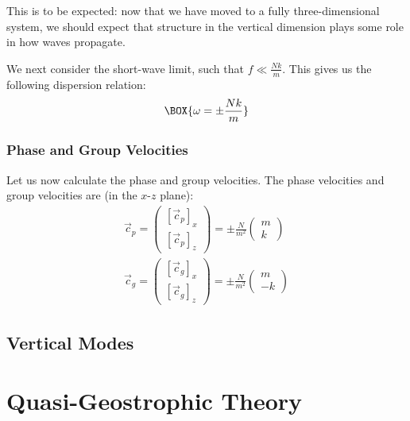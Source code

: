 This is to be expected: now that we have moved to a fully three-dimensional system, we should expect that structure in the vertical dimension plays some role in how waves propagate.

We next consider the short-wave limit, such that \(f\ll \frac{Nk}{m}\). This gives us the following dispersion relation:
\begin{align*}
    \BOX{\omega = \pm \frac{Nk}{m}}
\end{align*}

\subsubsection{Phase and Group Velocities}

Let us now calculate the phase and group velocities. The phase velocities and group velocities are (in the \(x\)-\(z\) plane):
\begin{align*}
    \vec{c}_p = \left( \begin{array}{c}
        [\vec{c}_p]_x
        \\
        [6pt]
        [\vec{c}_p]_z
    \end{array} \right)
    =
    \pm \frac{N}{m^2}\left( \begin{array}{c}
        m
        \\
        [6pt]
        k
    \end{array} \right)
    \\
    \vec{c}_g = \left( \begin{array}{c}
        [\vec{c}_g]_x
        \\
        [6pt]
        [\vec{c}_g]_z
    \end{array} \right)
    =
    \pm \frac{N}{m^2}\left( \begin{array}{c}
        m
        \\
        [6pt]
        -k
    \end{array} \right)
\end{align*}



\subsection{Vertical Modes}

\section{Quasi-Geostrophic Theory}\label{QG}

